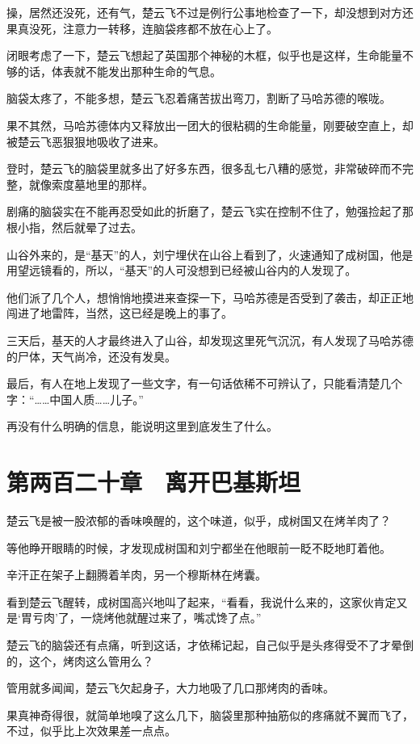 操，居然还没死，还有气，楚云飞不过是例行公事地检查了一下，却没想到对方还果真没死，注意力一转移，连脑袋疼都不放在心上了。

闭眼考虑了一下，楚云飞想起了英国那个神秘的木框，似乎也是这样，生命能量不够的话，体表就不能发出那种生命的气息。

脑袋太疼了，不能多想，楚云飞忍着痛苦拔出弯刀，割断了马哈苏德的喉咙。

果不其然，马哈苏德体内又释放出一团大的很粘稠的生命能量，刚要破空直上，却被楚云飞恶狠狠地吸收了进来。

登时，楚云飞的脑袋里就多出了好多东西，很多乱七八糟的感觉，非常破碎而不完整，就像索度墓地里的那样。

剧痛的脑袋实在不能再忍受如此的折磨了，楚云飞实在控制不住了，勉强捡起了那根小指，然后就晕了过去。

山谷外来的，是“基天”的人，刘宁埋伏在山谷上看到了，火速通知了成树国，他是用望远镜看的，所以，“基天”的人可没想到已经被山谷内的人发现了。

他们派了几个人，想悄悄地摸进来查探一下，马哈苏德是否受到了袭击，却正正地闯进了地雷阵，当然，这已经是晚上的事了。

三天后，基天的人才最终进入了山谷，却发现这里死气沉沉，有人发现了马哈苏德的尸体，天气尚冷，还没有发臭。

最后，有人在地上发现了一些文字，有一句话依稀不可辨认了，只能看清楚几个字：“……中国人质……儿子。”

再没有什么明确的信息，能说明这里到底发生了什么。

\section{第两百二十章　离开巴基斯坦}

楚云飞是被一股浓郁的香味唤醒的，这个味道，似乎，成树国又在烤羊肉了？

等他睁开眼睛的时候，才发现成树国和刘宁都坐在他眼前一眨不眨地盯着他。

辛汗正在架子上翻腾着羊肉，另一个穆斯林在烤囊。

看到楚云飞醒转，成树国高兴地叫了起来，“看看，我说什么来的，这家伙肯定又是‘胃亏肉’了，一烧烤他就醒过来了，嘴忒馋了点。”

楚云飞的脑袋还有点痛，听到这话，才依稀记起，自己似乎是头疼得受不了才晕倒的，这个，烤肉这么管用么？

管用就多闻闻，楚云飞欠起身子，大力地吸了几口那烤肉的香味。

果真神奇得很，就简单地嗅了这么几下，脑袋里那种抽筋似的疼痛就不翼而飞了，不过，似乎比上次效果差一点点。


